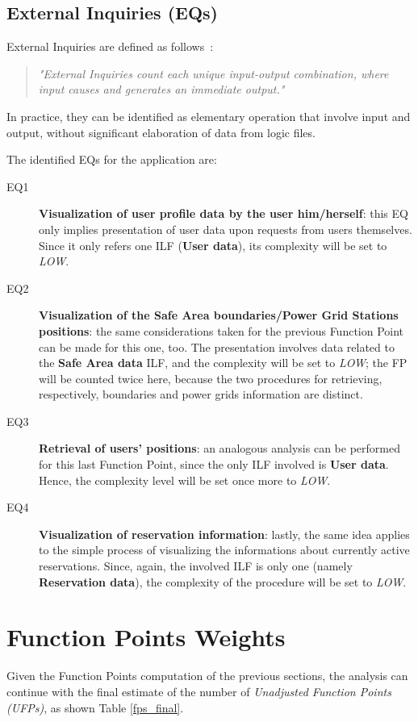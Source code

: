 \subsection{External Inquiries (EQs)}
External Inquiries are defined as follows~\cite{cocomo-manual}:
\begin{quotation}
\textit{"External Inquiries count each unique input-output combination, where input causes and generates an immediate output."}
\end{quotation}
In practice, they can be identified as elementary operation that involve input and output, without significant elaboration of data from logic files.

The identified EQs for the application are:
\begin{description}
\item[EQ1] \textbf{Visualization of user profile data by the user him/herself}: this EQ only implies presentation of user data upon requests from users themselves. Since it only refers one ILF (\textbf{User data}), its complexity will be set to \textit{LOW}.
\item[EQ2] \textbf{Visualization of the Safe Area boundaries/Power Grid Stations positions}: the same considerations taken for the previous Function Point can be made for this one, too. The presentation involves data related to the \textbf{Safe Area data} ILF, and the complexity will be set to \textit{LOW}; the FP will be counted twice here, because the two procedures for retrieving, respectively, boundaries and power grids information are distinct.
\item[EQ3] \textbf{Retrieval of users' positions}: an analogous analysis can be performed for this last Function Point, since the only ILF involved is \textbf{User data}. Hence, the complexity level will be set once more to \textit{LOW}.
\item[EQ4] \textbf{Visualization of reservation information}: lastly, the same idea applies to the simple process of visualizing the informations about currently active reservations. Since, again, the involved ILF is only one (namely \textbf{Reservation data}), the complexity of the procedure will be set to \textit{LOW}.
\end{description}

\section{Function Points Weights}
Given the Function Points computation of the previous sections, the analysis can continue with the final estimate of the number of \textit{Unadjusted Function Points (UFPs)}, as shown Table \ref{fps_final}.

